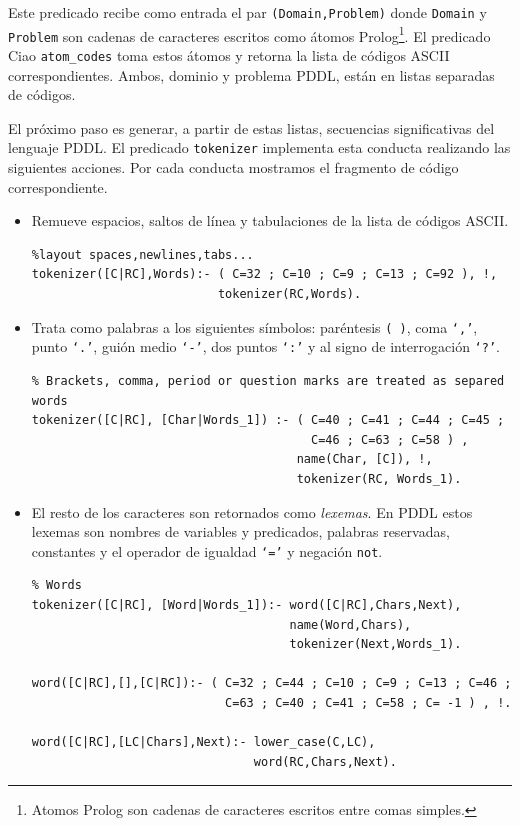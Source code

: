 Este predicado recibe como entrada el par \texttt{(Domain,Problem)}
donde \texttt{Domain} y \texttt{Problem} son cadenas de caracteres
escritos como \'atomos Prolog\footnote{Atomos Prolog son cadenas de
caracteres escritos entre comas simples.}.
El predicado Ciao \texttt{atom\_codes} toma estos \'atomos y retorna
la lista de c\'odigos ASCII correspondientes. Ambos, dominio y problema 
PDDL, est\'an en listas separadas de c\'odigos. 

El pr\'oximo paso es generar, a partir de estas listas, secuencias 
significativas del lenguaje PDDL. El predicado
\texttt{tokenizer} implementa esta conducta realizando las siguientes
acciones. Por cada conducta mostramos el fragmento de c\'odigo 
correspondiente.

\begin{itemize}

\item Remueve espacios, saltos de l\'inea y tabulaciones de la lista de
c\'odigos ASCII.

          \begin{verbatim}
%layout spaces,newlines,tabs...
tokenizer([C|RC],Words):- ( C=32 ; C=10 ; C=9 ; C=13 ; C=92 ), !, 
                          tokenizer(RC,Words).
          \end{verbatim}

\item Trata como palabras a los siguientes s\'imbolos:
par\'entesis \texttt{( )}, coma \texttt{`,'}, 
punto \texttt{`.'}, gui\'on medio \texttt{`-'}, dos puntos \texttt{`:'} y al
signo de interrogaci\'on \texttt{`?'}.

         \begin{verbatim}
% Brackets, comma, period or question marks are treated as separed words
tokenizer([C|RC], [Char|Words_1]) :- ( C=40 ; C=41 ; C=44 ; C=45 ;
                                       C=46 ; C=63 ; C=58 ) , 
                                     name(Char, [C]), !,
                                     tokenizer(RC, Words_1).
         \end{verbatim}

\item El resto de los caracteres son retornados como \emph{lexemas}. 
En PDDL estos lexemas son nombres de variables y predicados, palabras
reservadas, constantes y el operador de igualdad \texttt{`='} y
negaci\'on \texttt{not}.

         \begin{verbatim}
% Words
tokenizer([C|RC], [Word|Words_1]):- word([C|RC],Chars,Next), 
                                    name(Word,Chars), 
                                    tokenizer(Next,Words_1).

word([C|RC],[],[C|RC]):- ( C=32 ; C=44 ; C=10 ; C=9 ; C=13 ; C=46 ; 
                           C=63 ; C=40 ; C=41 ; C=58 ; C= -1 ) , !.

word([C|RC],[LC|Chars],Next):- lower_case(C,LC), 
                               word(RC,Chars,Next).
         \end{verbatim} 

\end{itemize}

